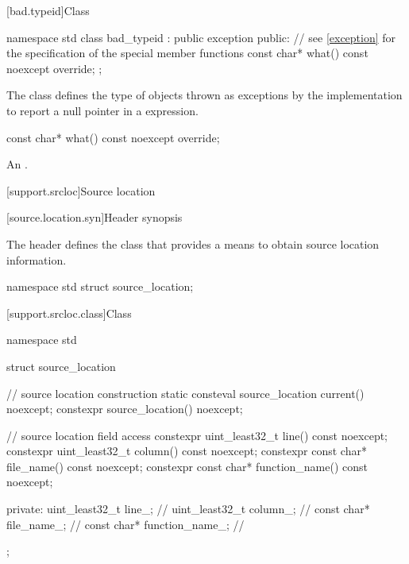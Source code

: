 [bad.typeid]{Class }

%
%
\begin{codeblock}
namespace std {
  class bad_typeid : public exception {
  public:
    // see \ref{exception} for the specification of the special member functions
    const char* what() const noexcept override;
  };
}
\end{codeblock}

\pnum
The class
defines the type of objects
thrown as exceptions by the implementation to report a null pointer
in a
expression.

%
\begin{itemdecl}
const char* what() const noexcept override;
\end{itemdecl}

\begin{itemdescr}
\pnum
\returns
An  \ntbs{}.
\end{itemdescr}

[support.srcloc]{Source location}

[source.location.syn]{Header  synopsis}

The header  defines
the class 
that provides a means to obtain source location information.

\begin{codeblock}
namespace std {
  struct source_location;
}
\end{codeblock}

[support.srcloc.class]{Class }

%
\begin{codeblock}
namespace std {
  struct source_location {
    // source location construction
    static consteval source_location current() noexcept;
    constexpr source_location() noexcept;

    // source location field access
    constexpr uint_least32_t line() const noexcept;
    constexpr uint_least32_t column() const noexcept;
    constexpr const char* file_name() const noexcept;
    constexpr const char* function_name() const noexcept;

  private:
    uint_least32_t line_;               // \expos
    uint_least32_t column_;             // \expos
    const char* file_name_;             // \expos
    const char* function_name_;         // \expos
  };
}
\end{codeblock}

